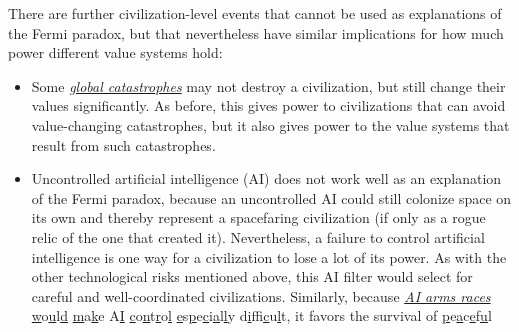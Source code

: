 \documentclass[]{article}
\begin{document}
There are further civilization-level events that cannot be used as
explanations of the Fermi paradox, but that nevertheless have similar
implications for how much power different value systems hold:

\begin{itemize}
\item
  Some
  \href{https://en.wikipedia.org/wiki/Global_catastrophic_risk}{\emph{global
  catastrophes}} may not destroy a civilization, but still change their
  values significantly. As before, this gives power to civilizations
  that can avoid value-changing catastrophes, but it also gives power to
  the value systems that result from such catastrophes.
\item
  Uncontrolled artificial intelligence (AI) does not work well as an
  explanation of the Fermi paradox, because an uncontrolled AI could
  still colonize space on its own and thereby represent a spacefaring
  civilization (if only as a rogue relic of the one that created it).
  Nevertheless, a failure to control artificial intelligence is one way
  for a civilization to lose a lot of its power. As with the other
  technological risks mentioned above, this AI filter would select for
  careful and well-coordinated civilizations. Similarly, because
  \href{https://wiki.lesswrong.com/wiki/AI_arms_race}{\emph{AI arms
  races}}
  \href{https://wiki.lesswrong.com/wiki/AI_arms_race}{w}o\href{https://wiki.lesswrong.com/wiki/AI_arms_race}{u}l\href{https://wiki.lesswrong.com/wiki/AI_arms_race}{d}
  \href{https://wiki.lesswrong.com/wiki/AI_arms_race}{m}a\href{https://wiki.lesswrong.com/wiki/AI_arms_race}{k}e
  A\href{https://wiki.lesswrong.com/wiki/AI_arms_race}{I}
  \href{https://wiki.lesswrong.com/wiki/AI_arms_race}{c}o\href{https://wiki.lesswrong.com/wiki/AI_arms_race}{n}t\href{https://wiki.lesswrong.com/wiki/AI_arms_race}{r}o\href{https://wiki.lesswrong.com/wiki/AI_arms_race}{l}
  \href{https://wiki.lesswrong.com/wiki/AI_arms_race}{e}s\href{https://wiki.lesswrong.com/wiki/AI_arms_race}{p}e\href{https://wiki.lesswrong.com/wiki/AI_arms_race}{c}i\href{https://wiki.lesswrong.com/wiki/AI_arms_race}{a}l\href{https://wiki.lesswrong.com/wiki/AI_arms_race}{l}y
  d\href{https://wiki.lesswrong.com/wiki/AI_arms_race}{i}f\href{https://wiki.lesswrong.com/wiki/AI_arms_race}{f}i\href{https://wiki.lesswrong.com/wiki/AI_arms_race}{c}u\href{https://wiki.lesswrong.com/wiki/AI_arms_race}{l}t,
  it favors the survival of
  \href{https://wiki.lesswrong.com/wiki/AI_arms_race}{p}e\href{https://wiki.lesswrong.com/wiki/AI_arms_race}{a}c\href{https://wiki.lesswrong.com/wiki/AI_arms_race}{e}f\href{https://wiki.lesswrong.com/wiki/AI_arms_race}{u}l

\end{itemize}
\end{document}
